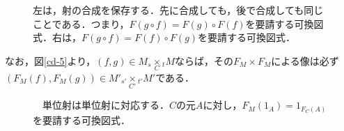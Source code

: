 \documentclass[uplatex, dvipdfmx]{jsreport}
\begin{document}
\begin{figure}[ht]\begin{center} \caption{\label{cd-6}左は，射の合成を保存する．先に合成しても，後で合成しても同じことである．つまり，$F(g\circ f)=F(g)\circ F(f)$を要請する可換図式．右は，$F(g\circ f)=F(f)\circ F(g)$を要請する可換図式．}
\end{center}\end{figure}
なお，図\ref{cd-5}より，$(f,g)\in M_s\underset{C}{\times}{}_tM$ならば，その$F_M\times F_M$による像は必ず$(F_M(f),F_M(g))\in M'_{s'}\underset{C'}{\times}{}_{t'}M'$である．

\begin{figure}[ht]\begin{center} \caption{\label{cd-7}　単位射は単位射に対応する．$C$の元$A$に対し，$F_M(1_A)=1_{F_C(A)}$を要請する可換図式．}
\end{center}\end{figure}
\end{document}
